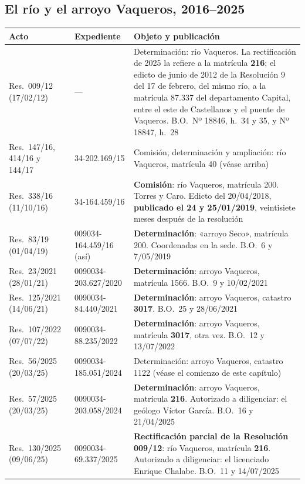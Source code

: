 \subsection*{El río y el arroyo Vaqueros, 2016--2025}

{\small
\setlength{\LTpre}{0.6em}\setlength{\LTpost}{1.2em}
\begin{longtable}{@{}p{2.4cm}p{3.3cm}p{6.2cm}@{}}
\toprule
\textbf{Acto} & \textbf{Expediente} & \textbf{Objeto y publicación} \\
\midrule
\endhead
Res.\ 009/12 (17/02/12) & --- & Determinación: río Vaqueros. La rectificación de 2025 la refiere a la matrícula \textbf{216}; el edicto de junio de 2012 de la Resolución 9 del 17 de febrero, del mismo río, a la matrícula 87.337 del departamento Capital, entre el este de Castellanos y el puente de Vaqueros. B.O.\ Nº 18846, h.\ 34 y 35, y Nº 18847, h.\ 28 \\
Res.\ 147/16, 414/16 y 144/17 & 34-202.169/15 & Comisión, determinación y ampliación: río Vaqueros, matrícula 40 (véase arriba) \\
Res.\ 338/16 (11/10/16) & 34-164.459/16 & \textbf{Comisión}: río Vaqueros, matrícula 200. Torres y Caro. Edicto del 20/04/2018, \textbf{publicado el 24 y 25/01/2019}, veintisiete meses después de la resolución \\
Res.\ 83/19 (01/04/19) & 009034-164.459/16 (así) & \textbf{Determinación}: «arroyo Seco», matrícula 200. Coordenadas en la sede. B.O.\ 6 y 7/05/2019 \\
Res.\ 23/2021 (28/01/21) & 0090034-203.627/2020 & \textbf{Determinación}: arroyo Vaqueros, matrícula 1566. B.O.\ 9 y 10/02/2021 \\
Res.\ 125/2021 (14/06/21) & 0090034-84.440/2021 & \textbf{Determinación}: arroyo Vaqueros, catastro \textbf{3017}. B.O.\ 25 y 28/06/2021 \\
Res.\ 107/2022 (07/07/22) & 0090034-88.235/2022 & \textbf{Determinación}: arroyo Vaqueros, matrícula \textbf{3017}, otra vez. B.O.\ 12 y 13/07/2022 \\
Res.\ 56/2025 (20/03/25) & 0090034-185.051/2024 & Determinación: arroyo Vaqueros, catastro 1122 (véase el comienzo de este capítulo) \\
Res.\ 57/2025 (20/03/25) & 0090034-203.058/2024 & \textbf{Determinación}: arroyo Vaqueros, matrícula \textbf{216}. Autorizado a diligenciar: el geólogo Víctor García. B.O.\ 16 y 21/04/2025 \\
Res.\ 130/2025 (09/06/25) & 0090034-69.337/2025 & \textbf{Rectificación parcial de la Resolución 009/12}: río Vaqueros, matrícula \textbf{216}. Autorizado a diligenciar: el licenciado Enrique Chalabe. B.O.\ 11 y 14/07/2025 \\
\bottomrule
\end{longtable}
}

